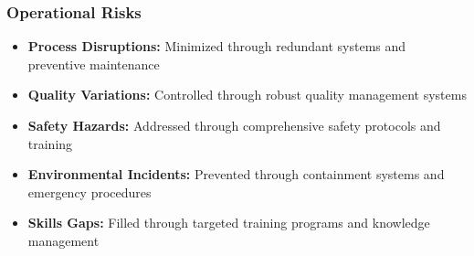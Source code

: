 \subsubsection{Operational Risks}
\begin{itemize}
    \item \textbf{Process Disruptions:} Minimized through redundant systems and preventive maintenance
    \item \textbf{Quality Variations:} Controlled through robust quality management systems
    \item \textbf{Safety Hazards:} Addressed through comprehensive safety protocols and training
    \item \textbf{Environmental Incidents:} Prevented through containment systems and emergency procedures
    \item \textbf{Skills Gaps:} Filled through targeted training programs and knowledge management
\end{itemize}
